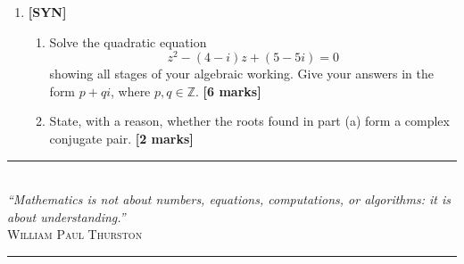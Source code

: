 \documentclass[11pt,a4paper]{article}
\begin{document}
\begin{enumerate}[resume]
\item \textbf{[SYN]} 
\begin{enumerate}[label=(\alph*)]
  \item Solve the quadratic equation
  \[
  z^2 - (4 - i)z + (5 - 5i) = 0
  \]
  showing all stages of your algebraic working. Give your answers in the form $p + qi$, where $p, q \in \mathbb{Z}$. \hfill{\textbf{[6 marks]}}
  \item State, with a reason, whether the roots found in part (a) form a complex conjugate pair. \hfill{\textbf{[2 marks]}}
\end{enumerate}

\end{enumerate}

\vspace{14pt}
\begin{center}
  {\color{accentline}\rule{0.4\textwidth}{0.4pt}}\\[5pt]
  {\footnotesize\itshape\color{medgray} ``Mathematics is not about numbers, equations, computations, or algorithms: it is about understanding.''}\\[2pt]
  {\scriptsize\scshape\color{medgray} William Paul Thurston}\\[5pt]
  {\color{accentline}\rule{0.4\textwidth}{0.4pt}}
\end{center}
\end{document}
